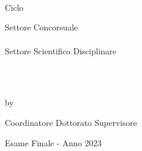 \begin{titlepage}
\begin{addmargin}[-1cm]{-3cm}
\begin{center}

\begingroup
\large
\myUniversity \\
\bigskip
{} \\ 
\spacedallcaps{\myFaculty} \\
\bigskip
Ciclo \myCycle
\vfill

Settore Concorsuale \\
\spacedlowsmallcaps{\mySector} \\
\medskip
Settore Scientifico Disciplinare \\
\spacedlowsmallcaps{\myScientificSector} \\
\vfill

\begingroup
\color{Maroon}
\spacedallcaps{\myTitle} \\ %
\bigskip
\endgroup

by \spacedlowsmallcaps{\myName} %
\vfill


Coordinatore Dottorato \hfill Supervisore \\
\spacedlowsmallcaps{\myCoordinator} \hfill \spacedlowsmallcaps{\mySupervisor}
\vfill

Esame Finale - Anno 2023
\endgroup
\end{center}
\end{addmargin}
\end{titlepage}